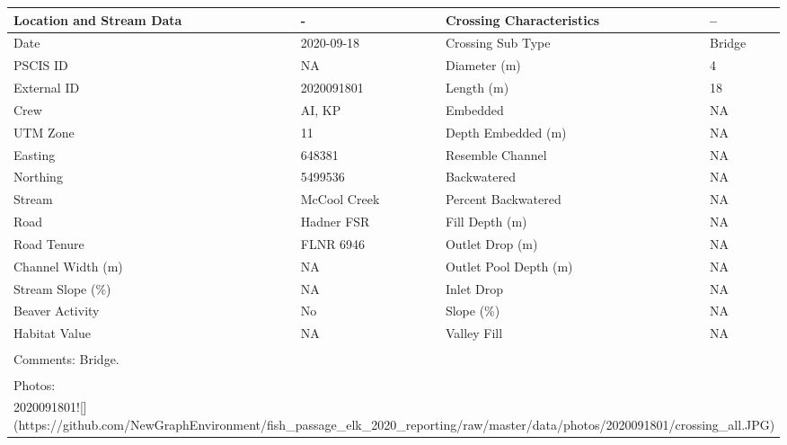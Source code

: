 \documentclass[
]{book}
\begin{document}
\begin{tabular}{l|l|l|l}
\hline
Location and Stream Data & - & Crossing Characteristics & --\\
\hline
Date & 2020-09-18 & Crossing Sub Type & Bridge\\
\hline
PSCIS ID & NA & Diameter (m) & 4\\
\hline
External ID & 2020091801 & Length (m) & 18\\
\hline
Crew & AI, KP & Embedded & NA\\
\hline
UTM Zone & 11 & Depth Embedded (m) & NA\\
\hline
Easting & 648381 & Resemble Channel & NA\\
\hline
Northing & 5499536 & Backwatered & NA\\
\hline
Stream & McCool Creek & Percent Backwatered & NA\\
\hline
Road & Hadner FSR & Fill Depth (m) & NA\\
\hline
Road Tenure & FLNR 6946 & Outlet Drop (m) & NA\\
\hline
Channel Width (m) & NA & Outlet Pool Depth (m) & NA\\
\hline
Stream Slope (\%) & NA & Inlet Drop & NA\\
\hline
Beaver Activity & No & Slope (\%) & NA\\
\hline
Habitat Value & NA & Valley Fill & NA\\
\hline
\multicolumn{4}{l}{\textsuperscript{} Comments: Bridge.}\\
\multicolumn{4}{l}{\textsuperscript{} Photos:}\\
\multicolumn{4}{l}{2020091801![](https://github.com/NewGraphEnvironment/fish\_passage\_elk\_2020\_reporting/raw/master/data/photos/2020091801/crossing\_all.JPG)}\\
\end{tabular}
\end{document}
